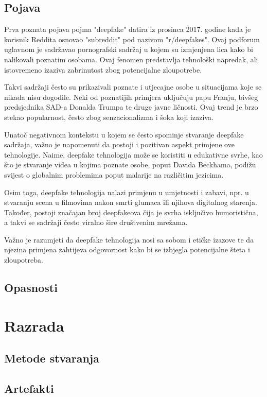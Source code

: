 \documentclass[seminarski, times, utf8]{fer}
\begin{document}
\section{Pojava}
Prva poznata pojava pojma "deepfake" datira iz prosinca 2017. godine kada je korisnik Reddita osnovao "subreddit" pod nazivom "r/deepfakes".%
Ovaj podforum uglavnom je sadržavao pornografski sadržaj u kojem su izmjenjena lica kako bi nalikovali poznatim osobama. Ovaj fenomen predstavlja tehnološki napredak, ali istovremeno izaziva zabrinutost zbog potencijalne zloupotrebe.

Takvi sadržaji često su prikazivali poznate i utjecajne osobe u situacijama koje se nikada nisu dogodile. Neki od poznatijih primjera uključuju papu Franju, bivšeg predsjednika SAD-a Donalda Trumpa te druge javne ličnosti. Ovaj trend je brzo stekao popularnost, često zbog senzacionalizma i šoka koji izaziva.

Unatoč negativnom kontekstu u kojem se često spominje stvaranje deepfake sadržaja, važno je napomenuti da postoji i pozitivan aspekt primjene ove tehnologije. Naime, deepfake tehnologija može se koristiti u edukativne svrhe, kao što je stvaranje videa u kojima poznate osobe, poput Davida Beckhama, podižu svijest o globalnim problemima poput malarije na različitim jezicima.

Osim toga, deepfake tehnologija nalazi primjenu u umjetnosti i zabavi, npr. u stvaranju scena u filmovima nakon smrti glumaca ili njihova digitalnog starenja. Također, postoji značajan broj deepfakeova čija je svrha isključivo humoristična, a takvi se sadržaji često viralno šire društvenim mrežama.

Važno je razumjeti da deepfake tehnologija nosi sa sobom i etičke izazove te da njezina primjena zahtijeva odgovornost kako bi se izbjegla potencijalne šteta i zloupotreba.
\section{Opasnosti}


\chapter{Razrada}
\section{Metode stvaranja}
\section{Artefakti}
\end{document}
